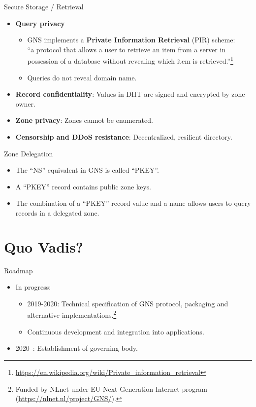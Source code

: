 \documentclass[aspectratio=169]{beamer}
\let\oldemph\textbf
\renewcommand{\textbf}[1]{{\color{mLightBrown}\oldemph{#1}}}
\begin{document}
\begin{frame}{Secure Storage / Retrieval}
   \begin{itemize}
    \item \textbf{Query privacy}
      \begin{itemize}
        \item GNS implements a \textbf{Private Information Retrieval} (PIR) scheme:\\
  ``a protocol that allows a user to retrieve an item from a server in possession of a database without revealing which item is retrieved.''\footnote{\url{https://en.wikipedia.org/wiki/Private_information_retrieval}}

        \item Queries do not reveal domain name.
      \end{itemize}
    \item \textbf{Record confidentiality}: Values in DHT are signed and encrypted by zone owner.
    \item \textbf{Zone privacy}: Zones cannot be enumerated.
    \item \textbf{Censorship and DDoS resistance}: Decentralized, resilient directory.
  \end{itemize}
\end{frame}

\begin{frame}{Zone Delegation}
  \begin{itemize}
    \item The ``NS'' equivalent in GNS is called ``PKEY''.
    \item A ``PKEY'' record contains public zone keys.
    \item The combination of a ``PKEY'' record value and a name allows users to
      query records in a delegated zone.
  \end{itemize}
\end{frame}



\section{Quo Vadis?}
\begin{frame}{Roadmap}
  \begin{itemize}
    \item In progress:
      \begin{itemize}
        \item 2019-2020: Technical specification of GNS protocol, packaging and alternative implementations.\footnote{Funded by NLnet under EU Next Generation Internet program (\url{https://nlnet.nl/project/GNS/}).}
        \item Continuous development and integration into applications.
      \end{itemize}
    \item 2020--: Establishment of governing body.
  \end{itemize}
\end{frame}
\end{document}
